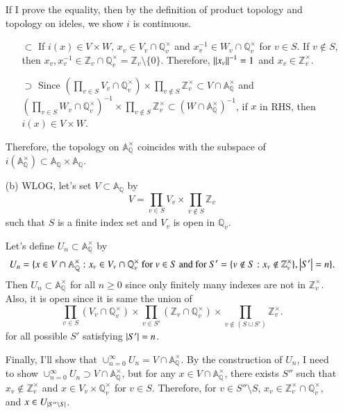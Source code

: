 \documentclass[a4paper, 12pt]{article}
\theoremstyle{Mydefinition}
\theoremstyle{Mytheorem}
\begin{document}
\begin{enumerate}
If I prove the equality, then by the definition of product topology and topology on ideles, we show $i$ is continuous.

\begin{enumerate}
    \item[$\subset$] If $i(x)\in V\times W$, $x_v\in V_v\cap \mathbb{Q}_v^\times$ and $x_v^{-1}\in W_v\cap \mathbb{Q}_v^\times$ for $v\in S$. If $v\not\in S$, then $x_v, x_v^{-1}\in \mathbb{Z}_v\cap \mathbb{Q}_v^\times = \mathbb{Z}_v\setminus\{0\}$. Therefore, $\norm{x_v}^{-1} = 1$ and $x_v\in \mathbb{Z}_v^\times$.
    \item[$\supset$] Since $\left(\prod_{v\in S} V_v \cap \mathbb{Q}_v^\times\right)\times \prod_{v\not\in S} \mathbb{Z}^\times_v\subset V\cap \mathbb{A}_\mathbb{Q}^\times$ and $\left(\prod_{v\in S} W_v \cap \mathbb{Q}_v^\times\right)^{-1}\times \prod_{v\not\in S} \mathbb{Z}^\times_v\subset (W\cap \mathbb{A}_\mathbb{Q}^\times)^{-1}$, if $x$ in RHS, then $i(x)\in V\times W$.
\end{enumerate}
Therefore, the topology on $\mathbb{A}_\mathbb{Q}^\times$ coincides with the subspace of $i(\mathbb{A}_\mathbb{Q}^\times)\subset \mathbb{A}_\mathbb{Q}\times \mathbb{A}_\mathbb{Q}$.

\item[(b)] WLOG, let's set $V\subset \mathbb{A}_\mathbb{Q}$ by
\begin{equation}
    V = \prod_{v\in S}V_v \times \prod_{v\not\in S} \mathbb{Z}_v
\end{equation}
such that $S$ is a finite index set and $V_v$ is open in $\mathbb{Q}_v$.

Let's define $U_n\subset \mathbb{A}_\mathbb{Q}^\times$ by 
\begin{equation}
    U_n = \{x\in V\cap \mathbb{A}_{\mathbb{Q}}^\times:x_v\in V_v \cap \mathbb{Q}_v^\times\textrm{ for }v\in S\textrm{ and for }S'=\{v\not\in S:x_v\not\in \mathbb{Z}_v^\times\}, \abs{S'} = n\}.
\end{equation}
Then $U_n\subset \mathbb{A}_\mathbb{Q}^\times$ for all $n\geq 0$ since only finitely many indexes are not in $\mathbb{Z}_v^\times$. Also, it is open since it is same the union of
\begin{equation}
    \prod_{v\in S}(V_v\cap \mathbb{Q}_v^\times)\times \prod_{v\in S'}(\mathbb{Z}_v\cap \mathbb{Q}_v^\times)\times \prod_{v\not\in (S\cup S')}\mathbb{Z}_v^\times.
\end{equation}
for all possible $S'$ satisfying $\abs{S'} = n$.

Finally, I'll show that $\cup_{n=0}^\infty U_n = V\cap \mathbb{A}_{\mathbb{Q}}^{\times}$. By the construction of $U_n$, I need to show $\cup_{n=0}^\infty U_n \supset V\cap \mathbb{A}_{\mathbb{Q}}^{\times}$, but for any $x\in V\cap \mathbb{A}_\mathbb{Q}^\times$, there exists $S''$ such that $x_v\not\in \mathbb{Z}_v^\times$ and $x\in V_v \times\mathbb{Q}_v^\times$ for $v\in S$. Therefore, for $v\in S''\setminus S$, $x_v\in \mathbb{Z}_v^\times \cap\mathbb{Q}_v^\times$, and $x\in U_{\abs{S''\setminus S}}$.


\end{enumerate}
\end{document}
